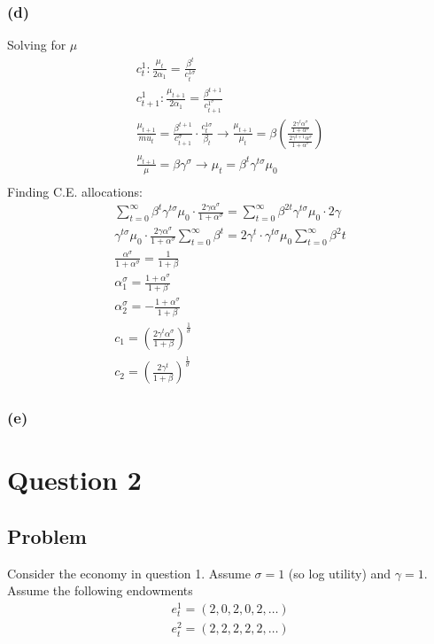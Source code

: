 \documentclass[10pt, a4paper]{article}
\begin{document}
    \subsubsection*{(d)}
      Solving for $\mu$
      \begin{gather*}
        c_t^1: \frac{\mu_t}{2\alpha_1} = \frac{\beta^t}{c_t^{1\sigma}} \\
        c_{t+1}^1: \frac{\mu_{t+1}}{2\alpha_1} = \frac{\beta^{t+1}}{c_{t+1}^{1^{\sigma}}} \\
        \frac{\mu_{t+1}}{mu_t} = \frac{\beta^{t+1}}{c_{t+1}^{\sigma}}\cdot\frac{c_t^{1\sigma}}{\beta_t} \rightarrow \frac{\mu_{t+1}}{\mu_t} = \beta(\frac{\frac{2\gamma^t\alpha^{\sigma}}{1+\alpha^{\sigma}}}{\frac{2\gamma^{t+1}\alpha^{\sigma}}{1+\alpha^{\sigma}}}) \\
        \frac{\mu_{t+1}}{\mu} = \beta\gamma^{\sigma} \rightarrow \mu_t = \beta^t\gamma^{t\sigma}\mu_0 \\
      \end{gather*}
      Finding C.E. allocations:
      \begin{gather*}
        \sum\limits_{t=0}^{\infty}\beta^t\gamma^{t\sigma}\mu_0\cdot\frac{2\gamma\alpha^{\sigma}}{1+\alpha^{\sigma}} = \sum\limits_{t=0}^{\infty}\beta^{2t}\gamma^{t\sigma}\mu_0\cdot2\gamma \\
        \gamma^{t\sigma}\mu_0\cdot\frac{2\gamma\alpha^{\sigma}}{1+\alpha^{\sigma}}\sum\limits_{t=0}^{\infty}\beta^t = 2\gamma^t\cdot\gamma^{t\sigma}\mu_0\sum\limits_{t=0}^{\infty}\beta^2t \\
        \frac{\alpha^{\sigma}}{1+\alpha^{\sigma}}  = \frac{1}{1+\beta} \\
        \alpha_1^{\sigma} = \frac{1+\alpha^{\sigma}}{1+\beta} \\
        \alpha_2^{\sigma} = -\frac{1+\alpha^{\sigma}}{1+\beta} \\
        c_1 = (\frac{2\gamma^t\alpha^\sigma}{1+\beta})^{\frac{1}{\sigma}} \\
        c_2 = (\frac{2\gamma^t}{1+\beta})^{\frac{1}{\sigma}}
      \end{gather*}
    \subsubsection*{(e)}
           
\section*{Question 2}
  \subsection*{Problem}
    Consider the economy in question 1. Assume $\sigma = 1$ (so log utility) and $\gamma = 1$. Assume the following endowments
    \begin{gather*}
      e^1_t = (2,0,2,0,2,\ldots)\\
      e^2_t = (2,2,2,2,2,\ldots)
    \end{gather*}
\end{document}
